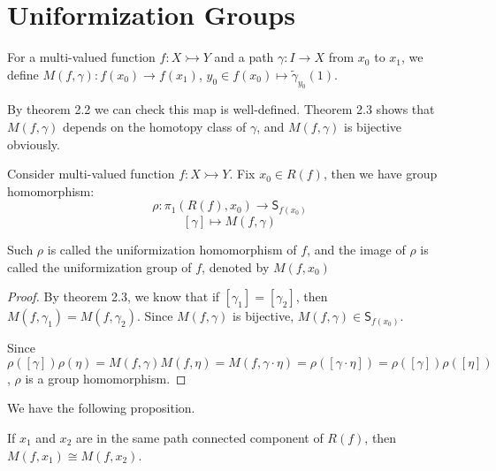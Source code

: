\documentclass[12pt]{article}
\newenvironment{definition}[2][Definition]{\begin{trivlist}
\item[\hskip \labelsep {\bfseries #1}\hskip \labelsep {\bfseries #2.}]}{\end{trivlist}}
\newenvironment{theorem}[2][Theorem]{\begin{trivlist}
\item[\hskip \labelsep {\bfseries #1}\hskip \labelsep {\bfseries #2.}]}{\end{trivlist}}
\newenvironment{proposition}[2][Proposition]{\begin{trivlist}
\item[\hskip \labelsep {\bfseries #1}\hskip \labelsep {\bfseries #2.}]}{\end{trivlist}}
\begin{document}
\section{Uniformization Groups}
\begin{definition}{3.1}
    For a multi-valued function $f:X\rightarrowtail Y$ and a path $\gamma :I\to X$ from $x_0$ to $x_1$, we define $M(f,\gamma): f(x_0)\to f(x_1)$, $y_0 \in f(x_0) \mapsto \tilde{\gamma}_{y_0}(1)$.
\end{definition}
 By theorem 2.2 we can check this map is well-defined. Theorem 2.3 shows that $M(f,\gamma)$ depends on the homotopy class of $\gamma$, and $M(f,\gamma)$ is bijective obviously.
\begin{theorem}{3.2}
    Consider multi-valued function $f:X\rightarrowtail Y$. Fix $x_0\in R(f)$, then we have group homomorphism:
     $$
     \rho:\pi_1(R(f),x_0)\xrightarrow{}\mathsf{S}_{f(x_0)}
     $$
     $$
     [\gamma]\mapsto M(f,\gamma)
     $$
     
     Such $\rho$ is called the uniformization homomorphism of $f$, and the image of $\rho$ is called the uniformization group of $f$, denoted by $M(f,x_0)$
\end{theorem}
\begin{proof}
    By theorem 2.3, we know that if $[\gamma_1]=[\gamma_2]$, then $M(f,\gamma_1)= M(f,\gamma_2)$. Since $M(f,\gamma)$ is bijective, $M(f,\gamma)\in \mathsf{S}_{f(x_0)}$.

    Since $\rho([\gamma])\rho({\eta})=M(f,\gamma)M(f,\eta)=M(f,\gamma \cdot \eta)=\rho([\gamma \cdot \eta])=\rho([\gamma])\rho([\eta])$, $\rho$ is a group homomorphism.
\end{proof}
We have the following proposition.
\begin{proposition}{3.3}
    If $x_1$ and $x_2$ are in the same path connected component of $R(f)$, then $M(f,x_1)\cong M(f,x_2)$.
\end{proposition}
\end{document}
